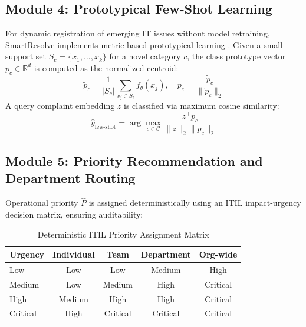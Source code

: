 \documentclass[conference]{IEEEtran}
\begin{document}
\subsection{Module 4: Prototypical Few-Shot Learning}
For dynamic registration of emerging IT issues without model retraining, SmartResolve implements metric-based prototypical learning \cite{snell2017}. Given a small support set $S_c = \{x_1, \dots, x_k\}$ for a novel category $c$, the class prototype vector $p_c \in \mathbb{R}^d$ is computed as the normalized centroid:
\begin{equation}
\tilde{p}_c = \frac{1}{|S_c|} \sum_{x_j \in S_c} f_\theta(x_j), \quad p_c = \frac{\tilde{p}_c}{\|\tilde{p}_c\|_2}
\end{equation}
A query complaint embedding $z$ is classified via maximum cosine similarity:
\begin{equation}
\hat{y}_{\text{few-shot}} = \arg\max_{c \in \mathcal{C}} \frac{z^\top p_c}{\|z\|_2 \|p_c\|_2}
\end{equation}

\subsection{Module 5: Priority Recommendation and Department Routing}
Operational priority $\hat{P}$ is assigned deterministically using an ITIL impact-urgency decision matrix, ensuring auditability:

\begin{table}[h]
\centering
\caption{Deterministic ITIL Priority Assignment Matrix}
\label{tab:priority}
\begin{tabular}{lcccc}
\toprule
\textbf{Urgency} & \textbf{Individual} & \textbf{Team} & \textbf{Department} & \textbf{Org-wide} \\
\midrule
Low & Low & Low & Medium & High \\
Medium & Low & Medium & High & Critical \\
High & Medium & High & High & Critical \\
Critical & High & Critical & Critical & Critical \\
\bottomrule
\end{tabular}
\end{table}
\end{document}
